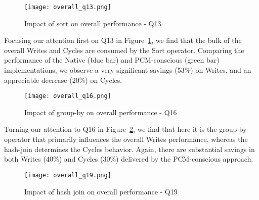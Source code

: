 \begin{figure}[htbp]
\centering
  	\texttt{[image: overall\_q13.png]}
	\caption{Impact of sort on overall performance - Q13}
	\label{fig:overall_results_q13}
\end{figure}

Focusing our attention first on Q13 in
Figure~\ref{fig:overall_results_q13}, we find that the bulk of the
overall Writes and Cycles are consumed by the Sort operator. Comparing
the performance of the Native (blue bar) and PCM-conscious (green bar)
implementations, we observe a very significant savings (53\%) on Writes,
and an appreciable decrease (20\%) on Cycles.

\begin{figure}[htbp]
	\centering
	\texttt{[image: overall\_q16.png]}
	\caption{Impact of group-by on overall performance - Q16}
	\label{fig:overall_results_q16}
\end{figure}
Turning our attention to Q16 in Figure~\ref{fig:overall_results_q16},
we find that here it is the group-by operator that primarily influences
the overall Writes performance, whereas the hash-join determines the
Cycles behavior. Again, there are substantial savings in both Writes
(40\%) and  Cycles (30\%) delivered by the PCM-conscious approach.

\begin{figure}[htbp]
	\centering
 	\texttt{[image: overall\_q19.png]}
	\caption{Impact of hash join on overall performance - Q19}
	\label{fig:overall_results_q19}
\end{figure}



\begin{comment}
In case of Q13, the running time and writes for the sort operator formed
the bulk of the writes and time taken for the entire query. The group-by
operator comparatively incurred negligible writes and running time. Writes
savings of 53\% and running time savings of 20\% were observed for the
execution of Q13 (shown in sub-figures (a) and (b) resp.) as compared
to native; fuelled mainly by the sort operator.
\end{comment}



\begin{comment}
In case of Q16, both the group-by and hash join operators incurred
significant writes and time. We observed savings of $40\%$ in writes
besides $30\%$ savings in running time as compared to  native algorithms.
\end{comment}

